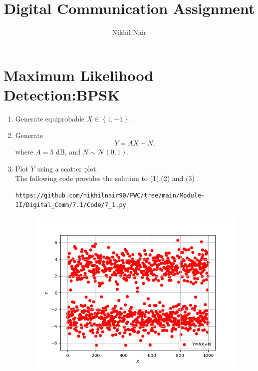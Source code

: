 \documentclass[journal,12pt,twocolumn]{IEEEtran}
\title{\mytitle}
\title{
Digital Communication Assignment
}
\author{Nikhil Nair}
\providecommand{\cbrak}[1]{\ensuremath{\left\{#1\right\}}}
\providecommand{\gauss}[2]{\mathcal{N}\ensuremath{\left(#1,#2\right)}}
\begin{document}
\maketitle
\bigskip


\section{\textbf{Maximum Likelihood Detection:BPSK}}
\begin{enumerate}
\item Generate equiprobable $X \in \cbrak{1,-1}$.
\item Generate 
\begin{equation}
Y = AX+N,  \nonumber
\end{equation}
where $A = 5$ dB,  and $N \sim \gauss{0}{1}$.
\item Plot $Y$ using a scatter plot.
\\

The following code  provides the solution to (1),(2) and (3) .
\\

\begin{lstlisting}
https://github.com/nikhilnair90/FWC/tree/main/Module-II/Digital_Comm/7.1/Code/7_1.py
\end{lstlisting}

\begin{figure}[h]
    \centering
\includegraphics[width=\columnwidth]{Figure/7_1.png}
    \label{fig:Scatter plot of Y}
\end{figure}


\end{enumerate}
\end{document}
